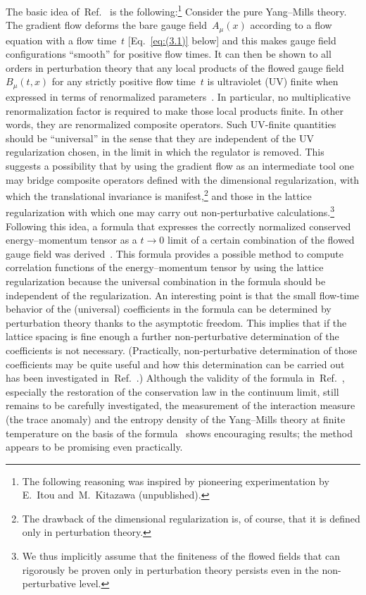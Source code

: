The basic idea of~Ref.~\cite{Suzuki:2013gza} is the following:\footnote{The
following reasoning was inspired by pioneering experimentation by E.~Itou
and~M.~Kitazawa (unpublished).} Consider the pure Yang--Mills theory. The
gradient flow deforms the bare gauge field~$A_\mu(x)$ according to a flow
equation with a flow time~$t$ [Eq.~\eqref{eq:(3.1)} below] and this makes gauge
field configurations ``smooth'' for positive flow times. It can then be shown
to all orders in perturbation theory that any local products of the flowed
gauge field~$B_\mu(t,x)$ for any strictly positive flow time~$t$ is ultraviolet
(UV) finite when expressed in terms of renormalized
parameters~\cite{Luscher:2011bx}. In particular, no multiplicative
renormalization factor is required to make those local products finite. In
other words, they are renormalized composite operators. Such UV-finite
quantities should be ``universal'' in the sense that they are independent of
the UV regularization chosen, in the limit in which the regulator is removed.
This suggests a possibility that by using the gradient flow as an intermediate
tool one may bridge composite operators defined with the dimensional
regularization, with which the translational invariance is
manifest,\footnote{The drawback of the dimensional regularization is, of
course, that it is defined only in perturbation theory.} and those in the
lattice regularization with which one may carry out non-perturbative
calculations.\footnote{We thus implicitly assume that the finiteness of the
flowed fields that can rigorously be proven only in perturbation theory
persists even in the non-perturbative level.} Following this idea, a formula
that expresses the correctly normalized conserved energy--momentum tensor as a
$t\to0$ limit of a certain combination of the flowed gauge field was
derived~\cite{Suzuki:2013gza}. This formula provides a possible method to
compute correlation functions of the energy--momentum tensor by using the
lattice regularization because the universal combination in the formula should
be independent of the regularization. An interesting point is that the small
flow-time behavior of the (universal) coefficients in the formula can be
determined by perturbation theory thanks to the asymptotic freedom. This
implies that if the lattice spacing is fine enough a further non-perturbative
determination of the coefficients is not necessary. (Practically,
non-perturbative determination of those coefficients may be quite useful and
how this determination can be carried out has been investigated
in~Ref.~\cite{DelDebbio:2013zaa}.) Although the validity of the formula
in~Ref.~\cite{Suzuki:2013gza}, especially the restoration of the conservation
law in the continuum limit, still remains to be carefully investigated, the
measurement of the interaction measure (the trace anomaly) and the entropy
density of the Yang--Mills theory at finite temperature on the basis of the
formula~\cite{Asakawa:2013laa} shows encouraging results; the method appears to
be promising even practically.


